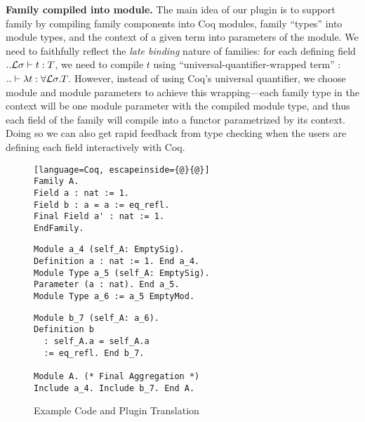 \textbf{Family compiled into module.} The main idea of our plugin is to support family by compiling
family components into Coq modules, family ``types'' into module types, and the context of a given term
into parameters of the module. We need to faithfully
reflect the \textit{late binding} nature of families: for each defining
field $ .. {\mathcal{L}}\sigma \vdash t : T $, we need to compile $t$ using
``universal-quantifier-wrapped term'' : $.. \vdash \lambda t : \forall
{\mathcal{L}} \sigma. T$. However, instead of using Coq's universal quantifier, we
choose module and module parameters to achieve this wrapping---each
family type in the context will be one module parameter
with the compiled module type, and thus each field of the family will
compile into a functor parametrized by its context. Doing so we can also
get rapid feedback from type checking when the users are defining each
field interactively with Coq.
\begin{figure}[!htb]
  \begin{minipage}[t]{0.30\linewidth}
\begin{lstlisting}[language=Coq, escapeinside={@}{@}]
Family A.
Field a : nat := 1.
Field b : a = a := eq_refl.
Final Field a' : nat := 1. 
EndFamily.
\end{lstlisting}
  \end{minipage}%
  \begin{minipage}[t]{0.35\linewidth}
\begin{verbatim}
Module a_4 (self_A: EmptySig).
Definition a : nat := 1. End a_4.
Module Type a_5 (self_A: EmptySig).
Parameter (a : nat). End a_5.
Module Type a_6 := a_5 EmptyMod.
\end{verbatim}
  \end{minipage}
  \begin{minipage}[t]{0.3\linewidth}
\begin{verbatim}
Module b_7 (self_A: a_6).
Definition b 
  : self_A.a = self_A.a 
  := eq_refl. End b_7.
  
Module A. (* Final Aggregation *)
Include a_4. Include b_7. End A.
\end{verbatim}
  \end{minipage}
  \caption{Example Code and Plugin Translation}\label{fig:plugin-example1}
\end{figure}



